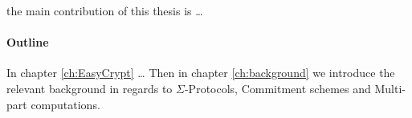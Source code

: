 the main contribution of this thesis is \dots


\paragraph{Outline}
In chapter \ref{ch:EasyCrypt} \dots
Then in chapter \ref{ch:background} we introduce the relevant background
in regards to $\Sigma$-Protocols, Commitment schemes and Multi-part computations.

